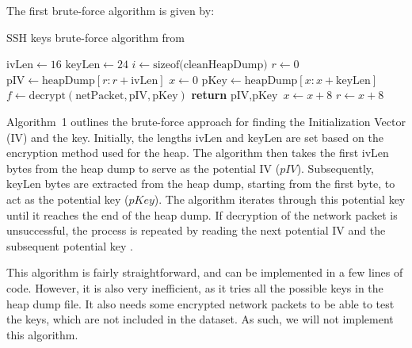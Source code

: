     The first brute-force algorithm is given by:

    \begin{algorithm}[H]
    \caption{SSH keys brute-force algorithm from  \cite{SmartKex22}}
    \begin{algorithmic}[1]
        \State $\text{ivLen} \gets 16$ 
        \State $\text{keyLen} \gets 24$ 
        \State $i \gets \text{sizeof(cleanHeapDump)}$
        \State $r \gets 0$
            \State $\text{pIV} \gets \text{heapDump}[r : r + \text{ivLen}]$
            \State $x \gets 0$
                \State $\text{pKey} \gets \text{heapDump}[x : x + \text{keyLen}]$
                \State $f \gets \text{decrypt}(\text{netPacket}, \text{pIV}, \text{pKey})$
                    \State \textbf{return} $\text{pIV}, \text{pKey}$
                \EndIf
                \State $x \gets x + 8$ 
            \EndWhile
            \State $r \gets x + 8$ 
        \EndWhile
    \EndProcedure
    \end{algorithmic}
    \end{algorithm}
    
    Algorithm~1 outlines the brute-force approach for finding the Initialization Vector (IV) and the key. Initially, the lengths \(\text{ivLen}\) and \(\text{keyLen}\) are set based on the encryption method used for the heap. The algorithm then takes the first \(\text{ivLen}\) bytes from the heap dump to serve as the potential IV (\(pIV\)). Subsequently, \(\text{keyLen}\) bytes are extracted from the heap dump, starting from the first byte, to act as the potential key (\(pKey\)). The algorithm iterates through this potential key until it reaches the end of the heap dump. If decryption of the network packet is unsuccessful, the process is repeated by reading the next potential IV and the subsequent potential key \cite{SmartKex22}. 

    This algorithm is fairly straightforward, and can be implemented in a few lines of code. However, it is also very inefficient, as it tries all the possible keys in the heap dump file. It also needs some encrypted network packets to be able to test the keys, which are not included in the dataset. As such, we will not implement this algorithm.
    
